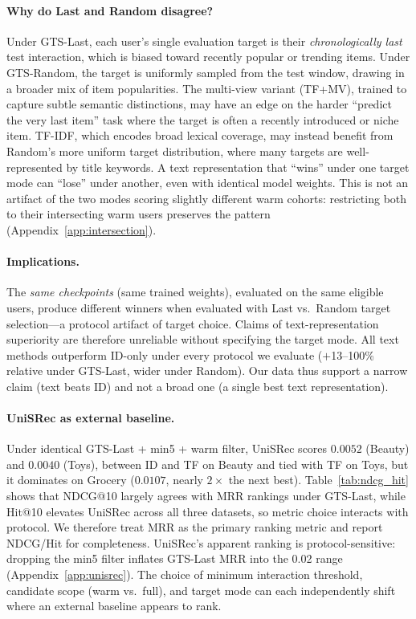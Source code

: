 \documentclass[sigconf,natbib=true,anonymous]{acmart}
\newcommand{\tfmv}{\textsc{TF+MV}\xspace}
\begin{document}
\paragraph{Why do Last and Random disagree?}
Under GTS-Last, each user's single evaluation target is their \emph{chronologically last} test interaction, which is biased toward recently popular or trending items.
Under GTS-Random, the target is uniformly sampled from the test window, drawing in a broader mix of item popularities.
The multi-view variant (\tfmv), trained to capture subtle semantic distinctions, may have an edge on the harder ``predict the very last item'' task where the target is often a recently introduced or niche item.
TF-IDF, which encodes broad lexical coverage, may instead benefit from Random's more uniform target distribution, where many targets are well-represented by title keywords.
A text representation that ``wins'' under one target mode can ``lose'' under another, even with identical model weights.
This is not an artifact of the two modes scoring slightly different warm cohorts: restricting both to their intersecting warm users preserves the pattern (Appendix~\ref{app:intersection}).

\paragraph{Implications.}
The \emph{same checkpoints} (same trained weights), evaluated on the same eligible users, produce different winners when evaluated with Last vs.\ Random target selection---a protocol artifact of target choice.
Claims of text-representation superiority are therefore unreliable without specifying the target mode.
All text methods outperform ID-only under every protocol we evaluate ($+$13--100\% relative under GTS-Last, wider under Random).
Our data thus support a narrow claim (text beats ID) and not a broad one (a single best text representation).

\paragraph{UniSRec as external baseline.}
Under identical GTS-Last + min5 + warm filter, UniSRec scores $0.0052$ (Beauty) and $0.0040$ (Toys), between ID and TF on Beauty and tied with TF on Toys, but it dominates on Grocery ($0.0107$, nearly $2\times$ the next best).
Table~\ref{tab:ndcg_hit} shows that NDCG@10 largely agrees with MRR rankings under GTS-Last, while Hit@10 elevates UniSRec across all three datasets, so metric choice interacts with protocol.
We therefore treat MRR as the primary ranking metric and report NDCG/Hit for completeness.
UniSRec's apparent ranking is protocol-sensitive: dropping the min5 filter inflates GTS-Last MRR into the 0.02 range (Appendix~\ref{app:unisrec}).
The choice of minimum interaction threshold, candidate scope (warm vs.\ full), and target mode can each independently shift where an external baseline appears to rank.
\end{document}
